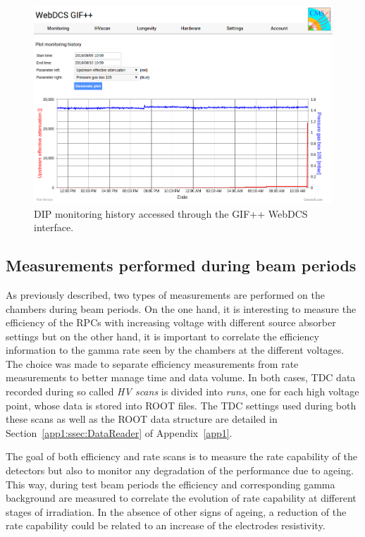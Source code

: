 	\begin{figure}[H]
        \centering
		\includegraphics[width = \plotwidth]{fig/chapt5/DIP_monitoring_history.png}
		\caption{\label{fig:DIP-monitoring} DIP monitoring history accessed through the GIF++ WebDCS interface.}
	\end{figure}

	\subsection{Measurements performed during beam periods}
	\label{chapt5:ssec:beamperiods}
	
	As previously described, two types of measurements are performed on the chambers during beam periods. On the one hand, it is interesting to measure the efficiency of the RPCs with increasing voltage with different source absorber settings but on the other hand, it is important to correlate the efficiency information to the gamma rate seen by the chambers at the different voltages. The choice was made to separate efficiency measurements from rate measurements to better manage time and data volume. In both cases, TDC data recorded during so called \textit{HV scans} is divided into \textit{runs}, one for each high voltage point, whose data is stored into ROOT files. The TDC settings used during both these scans as well as the ROOT data structure are detailed in Section~\ref{app1:ssec:DataReader} of Appendix~\ref{app1}.
	
	The goal of both efficiency and rate scans is to measure the rate capability of the detectors but also to monitor any degradation of the performance due to ageing. This way, during test beam periods the efficiency and corresponding gamma background are measured to correlate the evolution of rate capability at different stages of irradiation. In the absence of other signs of ageing, a reduction of the rate capability could be related to an increase of the electrodes resistivity.
	
